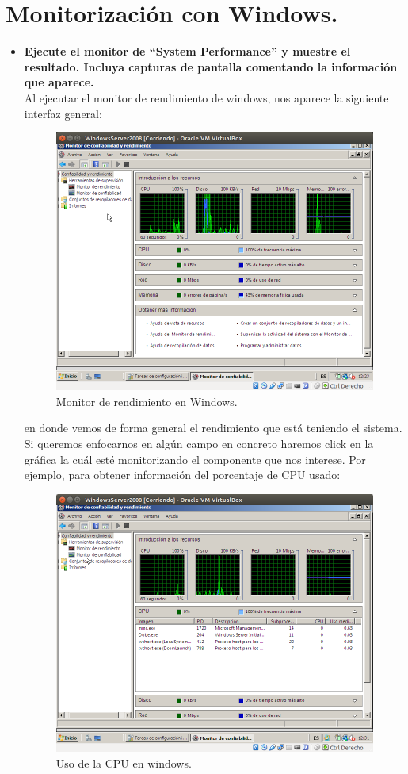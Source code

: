 \section{Monitorización con Windows.}
\begin{itemize}
		\item \textbf{Ejecute el monitor de “System Performance” y muestre el resultado. Incluya capturas de pantalla comentando la información que aparece.}\\
		Al ejecutar el monitor de rendimiento de windows, nos aparece la siguiente interfaz general:\\
		
		\begin{figure}[H]
		\centering
		\includegraphics[width=0.6\linewidth]{Profiling_windows}
		\caption[WindowsMonitor]{Monitor de rendimiento en Windows.}
		\label{fig:Profiling_windows}
		\end{figure}
		
		en donde vemos de forma general el rendimiento que está teniendo el sistema. Si queremos enfocarnos en algún campo en concreto haremos click en la gráfica la cuál esté monitorizando el componente que nos interese. Por ejemplo, para obtener información del porcentaje de CPU usado:\\
		
		\begin{figure}[H]
		\centering
		\includegraphics[width=0.6\linewidth]{WindowsCPU}
		\caption[WindowsCPU]{Uso de la CPU en windows.}
		\label{fig:WindowsCPU}
		\end{figure}
		

\end{itemize}
